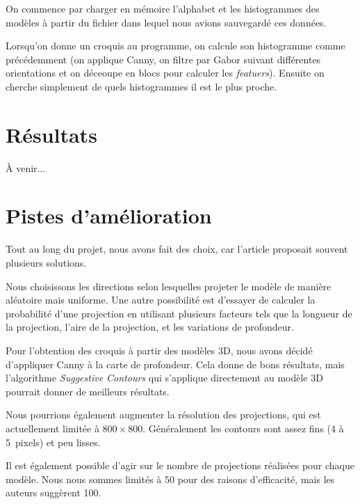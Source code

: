 \documentclass[12pt, a4paper, oneside]{article}
\begin{document}
On commence par charger en mémoire l'alphabet et les histogrammes des modèles à partir du fichier dans lequel nous avions sauvegardé ces données.

Lorsqu'on donne un croquis au programme, on calcule son histogramme comme précédemment (on applique Canny, on filtre par Gabor suivant différentes orientations et on déceoupe en blocs pour calculer les \emph{featuers}).
Ensuite on cherche simplement de quels histogrammes il est le plus proche.


\section{Résultats}

À venir...

\section{Pistes d'amélioration}

Tout au long du projet, nous avons fait des choix, car l'article proposait souvent plusieurs solutions.

Nous choisissons les directions selon lesquelles projeter le modèle de manière aléatoire mais uniforme.
Une autre possibilité est d'essayer de calculer la probabilité d'une projection en utilisant plusieurs facteurs tels que la longueur de la projection, l'aire de la projection, et les variations de profondeur.

Pour l'obtention des croquis à partir des modèles 3D, nous avons décidé d'appliquer Canny à la carte de profondeur.
Cela donne de bons résultats, mais l'algorithme \emph{Suggestive Contours} qui s'applique directement au modèle 3D pourrait donner de meilleurs résultats.

Nous pourrions également augmenter la résolution des projections, qui est actuellement limitée à $800 \times 800$.
Généralement les contours sont assez fins (4 à 5~pixels) et peu lisses.

Il est également possible d'agir sur le nombre de projections réalisées pour chaque modèle.
Nous nous sommes limités à 50 pour des raisons d'efficacité, mais les auteurs suggèrent 100.
\end{document}
